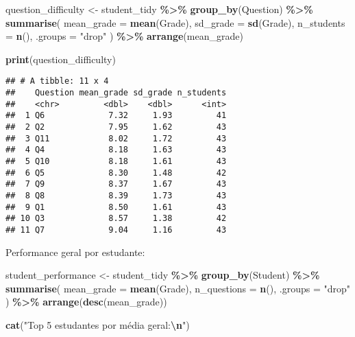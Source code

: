 \documentclass[
]{article}
\newenvironment{Shaded}{\begin{snugshade}}{\end{snugshade}}
\newcommand{\AttributeTok}[1]{\textcolor[rgb]{0.13,0.29,0.53}{#1}}
\newcommand{\FunctionTok}[1]{\textcolor[rgb]{0.13,0.29,0.53}{\textbf{#1}}}
\newcommand{\NormalTok}[1]{#1}
\newcommand{\OtherTok}[1]{\textcolor[rgb]{0.56,0.35,0.01}{#1}}
\newcommand{\SpecialCharTok}[1]{\textcolor[rgb]{0.81,0.36,0.00}{\textbf{#1}}}
\newcommand{\StringTok}[1]{\textcolor[rgb]{0.31,0.60,0.02}{#1}}
\begin{document}
\begin{Shaded}
\begin{Highlighting}[]
\NormalTok{question\_difficulty }\OtherTok{\textless{}{-}}\NormalTok{ student\_tidy }\SpecialCharTok{\%\textgreater{}\%}
  \FunctionTok{group\_by}\NormalTok{(Question) }\SpecialCharTok{\%\textgreater{}\%}
  \FunctionTok{summarise}\NormalTok{(}
    \AttributeTok{mean\_grade =} \FunctionTok{mean}\NormalTok{(Grade),}
    \AttributeTok{sd\_grade =} \FunctionTok{sd}\NormalTok{(Grade),}
    \AttributeTok{n\_students =} \FunctionTok{n}\NormalTok{(),}
    \AttributeTok{.groups =} \StringTok{"drop"}
\NormalTok{  ) }\SpecialCharTok{\%\textgreater{}\%}
  \FunctionTok{arrange}\NormalTok{(mean\_grade)}

\FunctionTok{print}\NormalTok{(question\_difficulty)}
\end{Highlighting}
\end{Shaded}

\begin{verbatim}
## # A tibble: 11 x 4
##    Question mean_grade sd_grade n_students
##    <chr>         <dbl>    <dbl>      <int>
##  1 Q6             7.32     1.93         41
##  2 Q2             7.95     1.62         43
##  3 Q11            8.02     1.72         43
##  4 Q4             8.18     1.63         43
##  5 Q10            8.18     1.61         43
##  6 Q5             8.30     1.48         42
##  7 Q9             8.37     1.67         43
##  8 Q8             8.39     1.73         43
##  9 Q1             8.50     1.61         43
## 10 Q3             8.57     1.38         42
## 11 Q7             9.04     1.16         43
\end{verbatim}

Performance geral por estudante:

\begin{Shaded}
\begin{Highlighting}[]
\NormalTok{student\_performance }\OtherTok{\textless{}{-}}\NormalTok{ student\_tidy }\SpecialCharTok{\%\textgreater{}\%}
  \FunctionTok{group\_by}\NormalTok{(Student) }\SpecialCharTok{\%\textgreater{}\%}
  \FunctionTok{summarise}\NormalTok{(}
    \AttributeTok{mean\_grade =} \FunctionTok{mean}\NormalTok{(Grade),}
    \AttributeTok{n\_questions =} \FunctionTok{n}\NormalTok{(),}
    \AttributeTok{.groups =} \StringTok{"drop"}
\NormalTok{  ) }\SpecialCharTok{\%\textgreater{}\%}
  \FunctionTok{arrange}\NormalTok{(}\FunctionTok{desc}\NormalTok{(mean\_grade))}

\FunctionTok{cat}\NormalTok{(}\StringTok{"Top 5 estudantes por média geral:}\SpecialCharTok{\textbackslash{}n}\StringTok{"}\NormalTok{)}
\end{Highlighting}
\end{Shaded}
\end{document}
